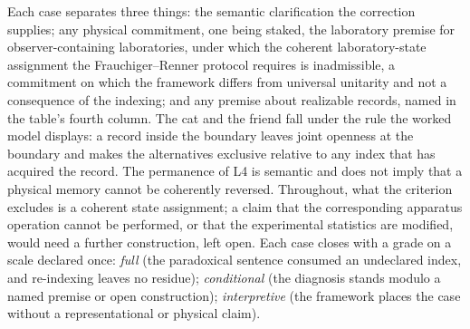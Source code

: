 \noindent Each case separates three things: the semantic clarification the correction supplies; any physical commitment, one being staked, the laboratory premise for observer-containing laboratories, under which the coherent laboratory-state assignment the Frauchiger--Renner protocol requires is inadmissible, a commitment on which the framework differs from universal unitarity and not a consequence of the indexing; and any premise about realizable records, named in the table's fourth column. The cat and the friend fall under the rule the worked model displays: a record inside the boundary leaves joint openness at the boundary and makes the alternatives exclusive relative to any index that has acquired the record. The permanence of L4 is semantic and does not imply that a physical memory cannot be coherently reversed. Throughout, what the criterion excludes is a coherent state assignment; a claim that the corresponding apparatus operation cannot be performed, or that the experimental statistics are modified, would need a further construction, left open. Each case closes with a grade on a scale declared once: \emph{full} (the paradoxical sentence consumed an undeclared index, and re-indexing leaves no residue); \emph{conditional} (the diagnosis stands modulo a named premise or open construction); \emph{interpretive} (the framework places the case without a representational or physical claim).

